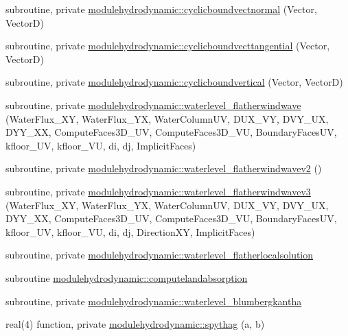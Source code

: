 \begin{DoxyCompactItemize}
\item 
subroutine, private \mbox{\hyperlink{namespacemodulehydrodynamic_ab70188c3f183ae7e6142adec6d3ea9fe}{modulehydrodynamic\+::cyclicboundvectnormal}} (Vector, VectorD)
\item 
subroutine, private \mbox{\hyperlink{namespacemodulehydrodynamic_a0d8c9bbfb63616e6ad93ba589923c7eb}{modulehydrodynamic\+::cyclicboundvecttangential}} (Vector, VectorD)
\item 
subroutine, private \mbox{\hyperlink{namespacemodulehydrodynamic_a700b6b9b38f8b3e2c1a84293c349c18a}{modulehydrodynamic\+::cyclicboundvertical}} (Vector, VectorD)
\item 
subroutine, private \mbox{\hyperlink{namespacemodulehydrodynamic_a31821bc82ef6a38083be92796ac733a3}{modulehydrodynamic\+::waterlevel\+\_\+flatherwindwave}} (Water\+Flux\+\_\+\+XY, Water\+Flux\+\_\+\+YX, Water\+Column\+UV, D\+U\+X\+\_\+\+VY, D\+V\+Y\+\_\+\+UX, D\+Y\+Y\+\_\+\+XX, Compute\+Faces3\+D\+\_\+\+UV, Compute\+Faces3\+D\+\_\+\+VU, Boundary\+Faces\+UV, kfloor\+\_\+\+UV, kfloor\+\_\+\+VU, di, dj, Implicit\+Faces)
\item 
subroutine, private \mbox{\hyperlink{namespacemodulehydrodynamic_ad3ece2178c3e256dbf915ccbe0b88599}{modulehydrodynamic\+::waterlevel\+\_\+flatherwindwavev2}} ()
\item 
subroutine, private \mbox{\hyperlink{namespacemodulehydrodynamic_ae8536b67d3763d371e3025b09e7920a6}{modulehydrodynamic\+::waterlevel\+\_\+flatherwindwavev3}} (Water\+Flux\+\_\+\+XY, Water\+Flux\+\_\+\+YX, Water\+Column\+UV, D\+U\+X\+\_\+\+VY, D\+V\+Y\+\_\+\+UX, D\+Y\+Y\+\_\+\+XX, Compute\+Faces3\+D\+\_\+\+UV, Compute\+Faces3\+D\+\_\+\+VU, Boundary\+Faces\+UV, kfloor\+\_\+\+UV, kfloor\+\_\+\+VU, di, dj, Direction\+XY, Implicit\+Faces)
\item 
subroutine, private \mbox{\hyperlink{namespacemodulehydrodynamic_a9e27696e9df4a46aae637e4ecb5bb626}{modulehydrodynamic\+::waterlevel\+\_\+flatherlocalsolution}}
\item 
subroutine \mbox{\hyperlink{namespacemodulehydrodynamic_a2cc7d18aae53734d8068f7a35a0fd029}{modulehydrodynamic\+::computelandabsorption}}
\item 
subroutine, private \mbox{\hyperlink{namespacemodulehydrodynamic_ae5c38adbe04a8331efddb3eb147a9de3}{modulehydrodynamic\+::waterlevel\+\_\+blumbergkantha}}
\item 
real(4) function, private \mbox{\hyperlink{namespacemodulehydrodynamic_ad663f2d92092122d354c40c8e3be00b0}{modulehydrodynamic\+::spythag}} (a, b)
\item 

\end{DoxyCompactItemize}
